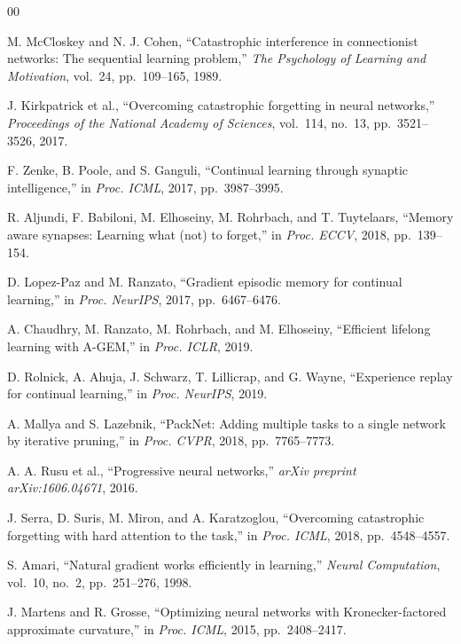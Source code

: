 \documentclass[conference]{IEEEtran}
\begin{document}
\begin{thebibliography}{00}

M. McCloskey and N. J. Cohen,
``Catastrophic interference in connectionist networks: The sequential learning problem,''
\textit{The Psychology of Learning and Motivation}, vol.~24, pp.~109--165, 1989.

J. Kirkpatrick et al.,
``Overcoming catastrophic forgetting in neural networks,''
\textit{Proceedings of the National Academy of Sciences}, vol.~114, no.~13,
pp.~3521--3526, 2017.

F. Zenke, B. Poole, and S. Ganguli,
``Continual learning through synaptic intelligence,''
in \textit{Proc. ICML}, 2017, pp.~3987--3995.

R. Aljundi, F. Babiloni, M. Elhoseiny, M. Rohrbach, and T. Tuytelaars,
``Memory aware synapses: Learning what (not) to forget,''
in \textit{Proc. ECCV}, 2018, pp.~139--154.

D. Lopez-Paz and M. Ranzato,
``Gradient episodic memory for continual learning,''
in \textit{Proc. NeurIPS}, 2017, pp.~6467--6476.

A. Chaudhry, M. Ranzato, M. Rohrbach, and M. Elhoseiny,
``Efficient lifelong learning with A-GEM,''
in \textit{Proc. ICLR}, 2019.

D. Rolnick, A. Ahuja, J. Schwarz, T. Lillicrap, and G. Wayne,
``Experience replay for continual learning,''
in \textit{Proc. NeurIPS}, 2019.

A. Mallya and S. Lazebnik,
``PackNet: Adding multiple tasks to a single network by iterative pruning,''
in \textit{Proc. CVPR}, 2018, pp.~7765--7773.

A. A. Rusu et al.,
``Progressive neural networks,''
\textit{arXiv preprint arXiv:1606.04671}, 2016.

J. Serra, D. Suris, M. Miron, and A. Karatzoglou,
``Overcoming catastrophic forgetting with hard attention to the task,''
in \textit{Proc. ICML}, 2018, pp.~4548--4557.

S. Amari,
``Natural gradient works efficiently in learning,''
\textit{Neural Computation}, vol.~10, no.~2, pp.~251--276, 1998.

J. Martens and R. Grosse,
``Optimizing neural networks with Kronecker-factored approximate curvature,''
in \textit{Proc. ICML}, 2015, pp.~2408--2417.


\end{thebibliography}
\end{document}
